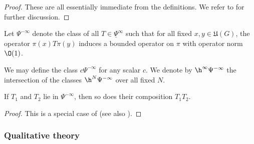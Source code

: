 \begin{proof}
  These are all essentially immediate from the definitions.  We refer to \cite[\S3]{nelson-venkatesh-1} for further discussion.
\end{proof}
\begin{definition}
  Let $\Psi^{-\infty}$ denote the class of all $T \in \underline{\Psi }^\infty$ such that for all fixed $x,y \in \mathfrak{U}(G)$, the operator $\pi(x) T \pi(y)$ induces a bounded operator on $\pi$ with operator norm $\O(1)$.

  We may define the class $c \Psi^{-\infty}$ for any scalar $c$.  We denote by $\h^\infty \Psi^{-\infty}$ the intersection of the classes $\h^N \Psi^{-\infty}$ over all fixed $N$.    
\end{definition}

\begin{lemma}
  If $T_1$ and $T_2$ lie in $\Psi^{-\infty}$, then so does their composition $T_1 T_2$.
\end{lemma}
\begin{proof}
  This is a special case of \cite[Lemma 10.2]{2020arXiv201202187N} (see also \cite[\S3.4]{nelson-venkatesh-1}).
\end{proof}




\subsubsection{Qualitative theory}

